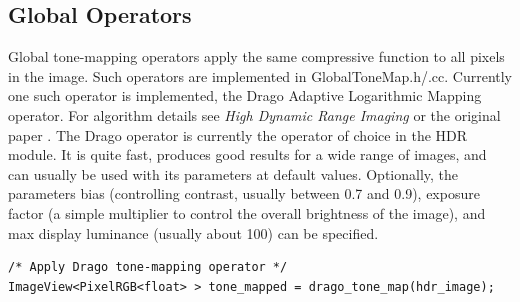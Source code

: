 \subsection{Global Operators}
Global tone-mapping operators apply the same compressive function to
all pixels in the image. Such operators are implemented in
GlobalToneMap.h/.cc. Currently one such operator is implemented, the
Drago Adaptive Logarithmic Mapping operator.  For algorithm details
see \emph{High Dynamic Range Imaging} \cite{hdrbook} or the original
paper \cite{drago}.  The Drago operator is currently the operator of
choice in the HDR module. It is quite fast, produces good results for
a wide range of images, and can usually be used with its parameters at
default values. Optionally, the parameters bias (controlling contrast,
usually between 0.7 and 0.9), exposure factor (a simple multiplier to
control the overall brightness of the image), and max display
luminance (usually about 100) can be specified.

\begin{verbatim}
/* Apply Drago tone-mapping operator */
ImageView<PixelRGB<float> > tone_mapped = drago_tone_map(hdr_image);
\end{verbatim}


